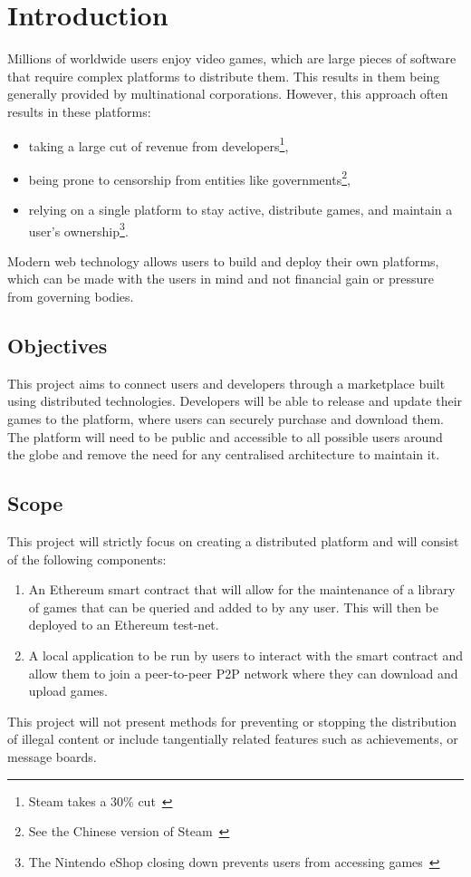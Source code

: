 
\chapter{Introduction}\label{sec:problem}

Millions of worldwide users enjoy video games, which are large pieces of software that require complex platforms to distribute them. This results in them being generally provided by multinational corporations. However, this approach often results in these platforms:

\begin{itemize}
  \item taking a large cut of revenue from developers\footnote{Steam takes a 30\% cut~\cite{marks_report_2019,brown_valve_2021}},
  \item being prone to censorship from entities like governments\footnote{See the Chinese version of Steam~\cite{noauthor_steam_nodate-1}},
  \item relying on a single platform to stay active, distribute games, and maintain a user's ownership\footnote{The Nintendo eShop closing down prevents users from accessing games~\cite{noauthor_nintendo_2022}}.
\end{itemize}

\newparagraph
Modern web technology allows users to build and deploy their own platforms, which can be made with the users in mind and not financial gain or pressure from governing bodies. 

\section{Objectives}

This project aims to connect users and developers through a marketplace built using distributed technologies. Developers will be able to release and update their games to the platform, where users can securely purchase and download them. The platform will need to be public and accessible to all possible users around the globe and remove the need for any centralised architecture to maintain it.

\section{Scope}

This project will strictly focus on creating a distributed platform and will consist of the following components:

\begin{enumerate}
  \item An Ethereum smart contract that will allow for the maintenance of a library of games that can be queried and added to by any user. This will then be deployed to an Ethereum test-net.
  \item A local application to be run by users to interact with the smart contract and allow them to join a peer-to-peer P2P network where they can download and upload games.
\end{enumerate}

\newparagraph
This project will not present methods for preventing or stopping the distribution of illegal content or include tangentially related features such as achievements, or message boards.
